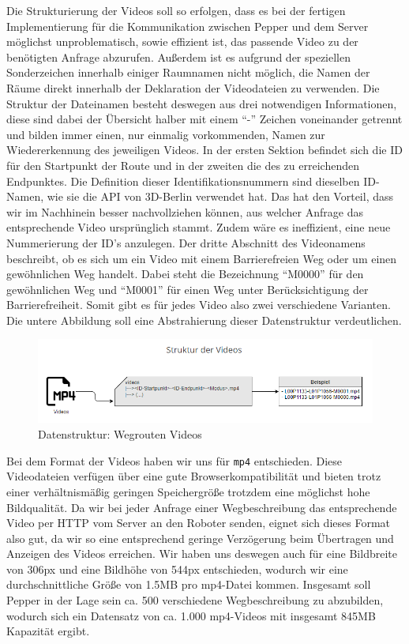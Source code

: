Die Strukturierung der Videos soll so erfolgen, dass es bei der fertigen Implementierung für die Kommunikation zwischen Pepper und dem Server möglichst unproblematisch, sowie effizient ist, das passende Video zu der benötigten Anfrage abzurufen. Außerdem ist es aufgrund der speziellen Sonderzeichen innerhalb einiger Raumnamen nicht möglich, die Namen der Räume direkt innerhalb der Deklaration der Videodateien zu verwenden. Die Struktur der Dateinamen besteht deswegen aus drei notwendigen Informationen, diese sind dabei der Übersicht halber mit einem ``-'' Zeichen voneinander getrennt und bilden immer einen, nur einmalig vorkommenden, Namen zur Wiedererkennung des jeweiligen Videos. In der ersten Sektion befindet sich die ID für den Startpunkt der Route und in der zweiten die des zu erreichenden Endpunktes. Die Definition dieser Identifikationsnummern sind dieselben ID-Namen, wie sie die API von 3D-Berlin verwendet hat. Das hat den Vorteil, dass wir im Nachhinein besser nachvollziehen können, aus welcher Anfrage das entsprechende Video ursprünglich stammt. Zudem wäre es ineffizient, eine neue Nummerierung der ID's anzulegen. Der dritte Abschnitt des Videonamens beschreibt, ob es sich um ein Video mit einem Barrierefreien Weg oder um einen gewöhnlichen Weg handelt. Dabei steht die Bezeichnung ``M0000'' für den gewöhnlichen Weg und ``M0001'' für einen Weg unter Berücksichtigung der Barrierefreiheit. Somit gibt es für jedes Video also zwei verschiedene Varianten. Die untere Abbildung soll eine Abstrahierung dieser Datenstruktur verdeutlichen.\\

\begin{figure}[H]
    \includegraphics[width=\textwidth]{Figures/3DNavigator/Videostruktur_Raumfinder.png}
    \caption{Datenstruktur: Wegrouten Videos}
    \label{fig:raumfinder-videostruktur}
    \centering
\end{figure}\vspace{-2.5mm}

Bei dem Format der Videos haben wir uns für \verb|mp4| entschieden. Diese Videodateien verfügen über eine gute Browserkompatibilität und bieten trotz einer verhältnismäßig geringen Speichergröße trotzdem eine möglichst hohe Bildqualität. Da wir bei jeder Anfrage einer Wegbeschreibung das entsprechende Video per HTTP vom Server an den Roboter senden, eignet sich dieses Format also gut, da wir so eine entsprechend geringe Verzögerung beim Übertragen und Anzeigen des Videos erreichen. Wir haben uns deswegen auch für eine Bildbreite von 306px und eine Bildhöhe von 544px entschieden, wodurch wir eine durchschnittliche Größe von 1.5MB pro mp4-Datei kommen. Insgesamt soll Pepper in der Lage sein ca. 500 verschiedene Wegbeschreibung zu abzubilden, wodurch sich ein Datensatz von ca. 1.000 mp4-Videos mit insgesamt 845MB Kapazität ergibt.\\

